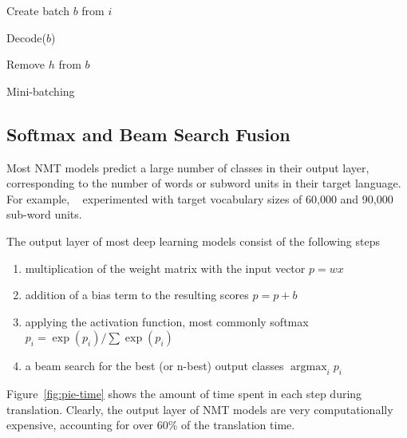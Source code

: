 \documentclass[11pt,a4paper]{article}
\DeclareMathOperator*{\argmax}{argmax}
\begin{document}
\begin{algorithm}
\begin{algorithmic}

\State Create batch $b$ from $i$

  \State Decode($b$)
  
      \State Remove $h$ from $b$
    \EndIf
  \EndFor
\EndWhile

\EndProcedure

\end{algorithmic}
\caption{Mini-batching}
\label{algo:Mini-batching}
\end{algorithm}


\subsection{Softmax and Beam Search Fusion}

Most NMT models predict a large number of classes in their output layer, corresponding to the number of words or subword units in their target language. For example, ~\citet{sennrich-haddow-birch:2016:P16-12} experimented with target vocabulary sizes of 60,000 and 90,000 sub-word units.

The output layer of most deep learning models consist of the following steps
\begin{enumerate}
   \item \vspace{-2 mm} multiplication of the weight matrix with the input vector $p = w x$
   \item \vspace{-2 mm} addition of a bias term to the resulting scores $p = p + b$
   \item \vspace{-2 mm} applying the activation function, most commonly softmax $ p_i = \exp(p_i) / \sum \exp(p_i) $
   \item \vspace{-2 mm} a beam search for the best (or n-best) output classes $\argmax_i p_i$
\end{enumerate}

Figure~\ref{fig:pie-time} shows the amount of time spent in each step during translation. Clearly, the output layer of NMT models are very computationally expensive, accounting for over 60\% of the translation time.
\end{document}
